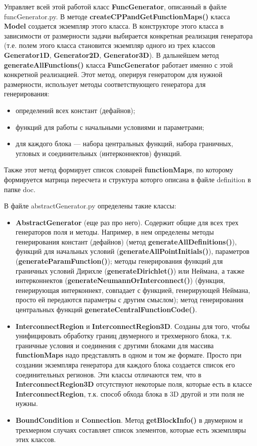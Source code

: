\documentclass[a4paper]{article}
\begin{document}
Управляет всей этой работой класс {\bf FuncGenerator}, описанный в файле funcGenerator.py. В методе {\bf createCPPandGetFunctionMaps()} класса {\bf Model} создается экземпляр этого класса. В конструкторе этого класса в зависимости от размерности задачи выбирается конкретная реализация генератора (т.е. полем этого класса становится экземпляр одного из трех классов {\bf Generator1D}, {\bf Generator2D}, {\bf Generator3D}). В дальнейшем метод {\bf generateAllFunctions()} класса {\bf Func\-Ge\-ne\-ra\-tor} работает именно с этой конкретной реализацией. Этот метод, оперируя генератором для нужной размерности, использует методы соответствующего генератора для генерирования:
\begin{itemize}
	\item определений всех констант (дефайнов);
	\item функций для работы с начальными условиями и параметрами;
	\item для каждого блока --- набора центральных функций, набора граничных, угловых и соединительных (интерконнектов) функций.
\end{itemize}
 Также этот метод формирует список словарей {\bf functionMaps}, по которому формируется матрица пересчета и структура которго описана в файле definition в папке doc.

В файле abstractGenerator.py определены такие классы:
\begin{itemize}
\item {\bf AbstractGenerator} (еще раз про него). Содержит общие для всех трех генераторов поля и методы. Например, в нем определены методы генерирования конст\-ант (дефайнов) (метод {\bf generateAllDefinitions()}), функций для на\-чаль\-ных условий ({\bf generateAllPointInitials()}), параметров ({\bf generateParamFunction()}); методы генерирования функций для гра\-нич\-ных условий Дирихле ({\bf generateDirichlet()}) или Неймана, а также интерконнектов ({\bf ge\-ne\-rate\-Neu\-mann\-Or\-In\-ter\-con\-nect()}) (функ\-ция, генерирующая интерконнект, совпадает с функцией, ге\-не\-ри\-ру\-ю\-щей Неймана, просто ей передаются параметры с другим смыслом); метод генерирования центральных функций {\bf generateCentralFunction\-Co\-de()}.
\item {\bf InterconnectRegion} и {\bf InterconnectRegion3D}. Созданы для того, чтобы унифицировать обработку границ двумерного и трехмерного блока, т.к. граничные условия и соединения с другими блоками для массива {\bf functionMaps} надо представлять в одном и том же формате. Просто при создании экземпляра генератора для каждого блока создается список его соединительных регионов. Эти классы отличаются тем, что в {\bf InterconnectRegion3D} отсутствуют некоторые поля, которые есть в классе {\bf InterconnectRegion}, т.к. способ обхода блока в 3D другой и эти поля не нужны.
\item {\bf BoundCondition} и {\bf Connection}. Метод {\bf getBlockInfo()} в двумерном и трехмерном случаях составляет список элементов, которые есть экземпляры этих классов.
\end{itemize}
\end{document}
